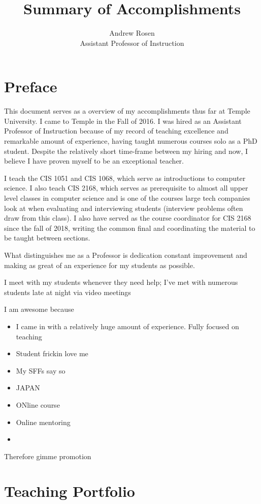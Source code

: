 \documentclass[]{article}
\title{Summary of Accomplishments}
\author{Andrew Rosen\\Assistant Professor of Instruction}
\begin{document}
\maketitle


\section{Preface}
This document serves as a overview of my accomplishments thus far at Temple University.  
I came to Temple in the Fall of 2016.
I was hired as an Assistant Professor of Instruction because of my record of teaching excellence and remarkable amount of experience, having taught numerous courses solo as a PhD student.
Despite the relatively short time-frame between my hiring and now, I believe I have proven myself to be an exceptional teacher.

I teach the CIS 1051 and CIS 1068, which serve as introductions to computer science.
I also teach CIS 2168,  which serves as prerequisite to almost all upper level classes in computer science and is one of the courses large tech companies look at when evaluating and interviewing students (interview problems often draw from this class).  I also have served as the course coordinator for CIS 2168 since the fall of 2018, writing the common final and coordinating the material to be taught between sections.


What distinguishes me as a Professor is dedication constant improvement and making as great of an experience for my students as possible.


I meet with my students whenever they need help; I've met with numerous students late at night via video meetings


I am awesome because
\begin{itemize}
	\item I came in with a relatively huge amount of experience.  Fully focused on teaching
	\item Student frickin love me
	\item My SFFs say so
	\item JAPAN
	\item ONline course
	\item Online mentoring
	\item 
\end{itemize}

Therefore gimme promotion

\section{Teaching Portfolio}
\end{document}
